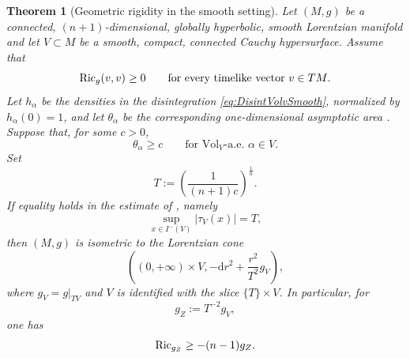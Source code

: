 \documentclass[a4paper,10pt]{article}
\newcommand{\di}{\mathrm{d}}
\newcommand{\Ric}{{\rm Ric}}
\newcommand{\vol}{\mathrm{Vol}}
\theoremstyle{plain}
\newtheorem{theorem}[lemma]{Theorem}
\theoremstyle{definition}
\numberwithin{equation}{section}
\begin{document}
\begin{theorem}[Geometric rigidity in the  smooth setting]
\label{Thm:secondsingularSmoothRigidity}
Let $(M,g)$ be a connected, $(n+1)$-dimensional, globally
hyperbolic, smooth Lorentzian manifold and let $V\subset M$ be a
smooth, compact, connected Cauchy hypersurface. Assume that
\begin{equation}\label{eq:SEC-smooth-rigidity}
    \Ric_g(v,v)\geq 0
    \qquad\text{for every timelike vector $v\in TM$}.
\end{equation}
Let $h_\alpha$ be the densities in the disintegration
\eqref{eq:DisintVolvSmooth}, normalized by $h_\alpha(0)=1$, and let
$\theta_\alpha$ be the corresponding one-dimensional asymptotic area
 . Suppose that, for some $c>0$,
\begin{equation}\label{eq:theta-lower-rigidity}
    \theta_\alpha\geq c
    \qquad\text{for $\vol_V$-a.e. $\alpha\in V$}.
\end{equation}
Set
\begin{equation}\label{eq:def-T-rigidity}
    T:=\left(\frac{1}{(n+1)c}\right)^{\frac1n}.
\end{equation}
If equality holds in the estimate of
, namely
\begin{equation}\label{eq:distance-equality-rigidity}
    \sup_{x\in I^-(V)}|\tau_V(x)|=T,
\end{equation}
then $(M,g)$ is isometric to the Lorentzian cone
\begin{equation}\label{eq:global-cone-rigidity}
    \left((0,+\infty)\times V,
    -\di r^2+\frac{r^2}{T^2}g_V\right),
\end{equation}
where $g_V=g|_{TV}$ and $V$ is identified with the slice
$\{T\}\times V$. In particular, for $$g_Z:=T^{-2}g_V,$$ one has
\begin{equation}\label{eq:fibre-Ricci-rigidity}
    \Ric_{g_Z}\geq -(n-1)g_Z.
\end{equation}
\end{theorem}
\end{document}

